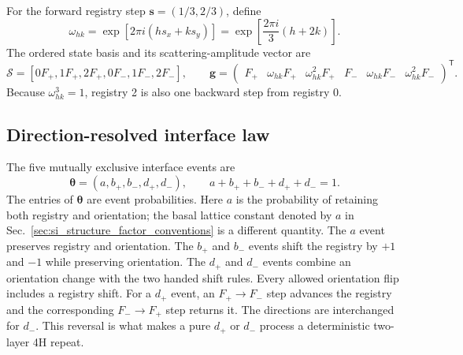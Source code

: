 For the forward registry step $\mathbf{s}=(1/3,2/3)$, define
\begin{equation}
  \omega_{hk}=\exp\!\left[2\pi i(hs_x+ks_y)\right]
  =\exp\!\left[\frac{2\pi i}{3}(h+2k)\right].
  \label{eq:si_pbi2_omega}
\end{equation}
The ordered state basis and its scattering-amplitude vector are
\begin{equation}
 \mathcal{S}=[0F_+,1F_+,2F_+,0F_-,1F_-,2F_-],\qquad
 \mathbf{g}=\begin{pmatrix}
 F_+&\omega_{hk} F_+&\omega_{hk}^2F_+&F_-&\omega_{hk} F_-&\omega_{hk}^2F_-
 \end{pmatrix}^{\mathsf T}.
 \label{eq:si_pbi2_state_amplitudes}
\end{equation}
Because $\omega_{hk}^3=1$, registry 2 is also one backward step from registry 0.

\subsection{Direction-resolved interface law}

The five mutually exclusive interface events are
\begin{equation}
 \boldsymbol{\theta}=(a,b_+,b_-,d_+,d_-),\qquad
 a+b_++b_-+d_++d_-=1.
 \label{eq:si_pbi2_interface_law}
\end{equation}
The entries of $\boldsymbol{\theta}$ are event probabilities. Here $a$ is the probability of retaining both registry and orientation; the basal lattice constant denoted by $a$ in Sec.~\ref{sec:si_structure_factor_conventions} is a different quantity. The $a$ event preserves registry and orientation. The $b_+$ and $b_-$ events shift the
registry by $+1$ and $-1$ while preserving orientation. The $d_+$ and $d_-$ events
combine an orientation change with the two handed shift rules.  Every allowed orientation flip includes a registry shift.  For a $d_+$ event, an $F_+\rightarrow F_-$ step
advances the registry and the corresponding $F_-\rightarrow F_+$ step returns
it.  The directions are interchanged for $d_-$.  This reversal is what makes a
pure $d_+$ or $d_-$ process a deterministic two-layer 4H repeat.

